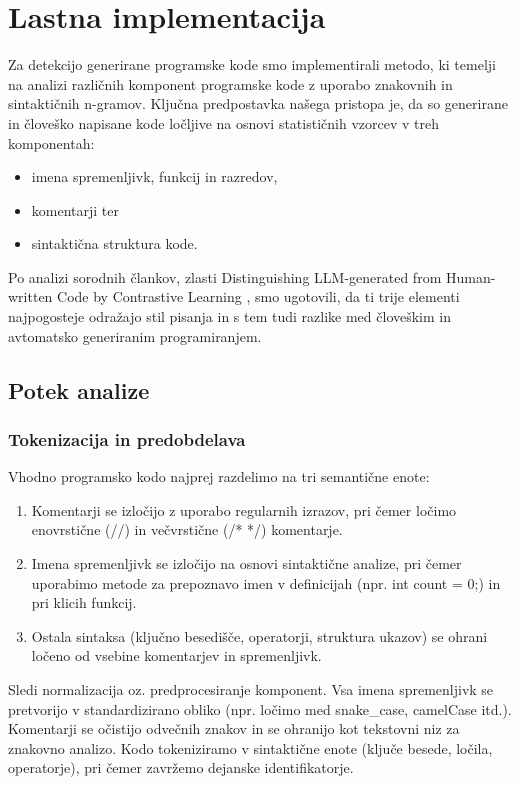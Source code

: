\documentclass[sigconf,nonacm]{acmart}
\begin{document}
\section{Lastna implementacija}
Za detekcijo generirane programske kode smo implementirali metodo, ki temelji na analizi različnih komponent programske kode z uporabo znakovnih in sintaktičnih n-gramov. Ključna predpostavka našega pristopa je, da so generirane in človeško napisane kode ločljive na osnovi statističnih vzorcev v treh komponentah:
\begin{itemize}
	\item imena spremenljivk, funkcij in razredov,
	\item komentarji ter
	\item sintaktična struktura kode.
\end{itemize}
Po analizi sorodnih člankov, zlasti Distinguishing LLM-generated from Human-written Code by Contrastive Learning \cite{xu2024distinguishing}, smo ugotovili, da ti trije elementi najpogosteje odražajo stil pisanja in s tem tudi razlike med človeškim in avtomatsko generiranim programiranjem.
\subsection{Potek analize}
\subsubsection{Tokenizacija in predobdelava}
Vhodno programsko kodo najprej razdelimo na tri semantične enote:
\begin{enumerate}
	\item Komentarji se izločijo z uporabo regularnih izrazov, pri čemer ločimo enovrstične (//) in večvrstične (/* */) komentarje.
	\item Imena spremenljivk se izločijo na osnovi sintaktične analize, pri čemer uporabimo metode za prepoznavo imen v definicijah (npr. int count = 0;) in pri klicih funkcij.
	\item Ostala sintaksa (ključno besedišče, operatorji, struktura ukazov) se ohrani ločeno od vsebine komentarjev in spremenljivk.
\end{enumerate}
Sledi normalizacija oz. predprocesiranje komponent.
Vsa imena spremenljivk se pretvorijo v standardizirano obliko (npr. ločimo med snake\_case, camelCase itd.).
Komentarji se očistijo odvečnih znakov in se ohranijo kot tekstovni niz za znakovno analizo.
Kodo tokeniziramo v sintaktične enote (ključe besede, ločila, operatorje), pri čemer zavržemo dejanske identifikatorje.
\end{document}
